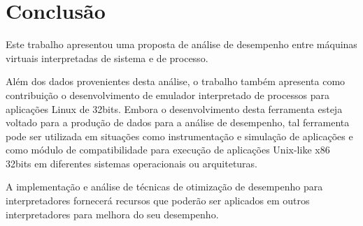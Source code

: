 \documentclass[11pt,twoside]{article}
\begin{document}
\section{Conclusão}  \label{sec:conclusao}

Este trabalho apresentou uma proposta de análise de desempenho entre máquinas virtuais interpretadas de sistema e de processo.

Além dos dados provenientes desta análise, o trabalho também apresenta como contribuição o desenvolvimento de emulador interpretado de processos para aplicações Linux de 32bits.
Embora o desenvolvimento desta ferramenta esteja voltado para a produção de dados para a análise de desempenho, tal ferramenta pode ser utilizada em situações como instrumentação e simulação de aplicações e como 
módulo de compatibilidade para execução de aplicações Unix-like x86 32bits em diferentes sistemas operacionais ou arquiteturas.

A implementação e análise de técnicas de otimização de desempenho para interpretadores fornecerá recursos que poderão ser aplicados em outros interpretadores para melhora do seu desempenho. 


\end{document}
